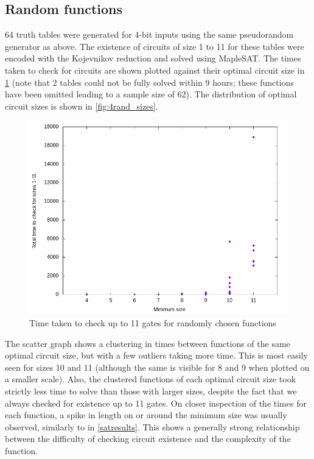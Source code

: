 \documentclass{article}
\begin{document}
\clearpage 

\subsection{Random functions}\label{randomresults}

64 truth tables were generated for 4-bit inputs using the same pseudorandom generator as above. The existence of circuits of size 1 to 11 for these tables were encoded with the Kojevnikov reduction and solved using MapleSAT. The times taken to check for circuits are shown plotted against their optimal circuit size in \ref{fig:4rand_scatter} (note that 2 tables could not be fully solved within 9 hours; these functions have been omitted leading to a sample size of 62). The distribution of optimal circuit sizes is shown in \ref{fig:4rand_sizes}.

\begin{figure}[!h]
  \includegraphics[width=\textwidth]{images/random/4bit_scatter.png}
  \caption{Time taken to check up to 11 gates for randomly chosen functions}
  \label{fig:4rand_scatter}
\end{figure}

The scatter graph shows a clustering in times between functions of the same optimal circuit size, but with a few outliers taking more time. This is most easily seen for sizes 10 and 11 (although the same is visible for 8 and 9 when plotted on a smaller scale). Also, the clustered functions of each optimal circuit size took strictly less time to solve than those with larger sizes, despite the fact that we always checked for existence up to 11 gates. On closer inspection of the times for each function, a spike in length on or around the minimum size was usually observed, similarly to in \ref{satresults}. This shows a generally strong relationship between the difficulty of checking circuit existence and the complexity of the function.
\end{document}
